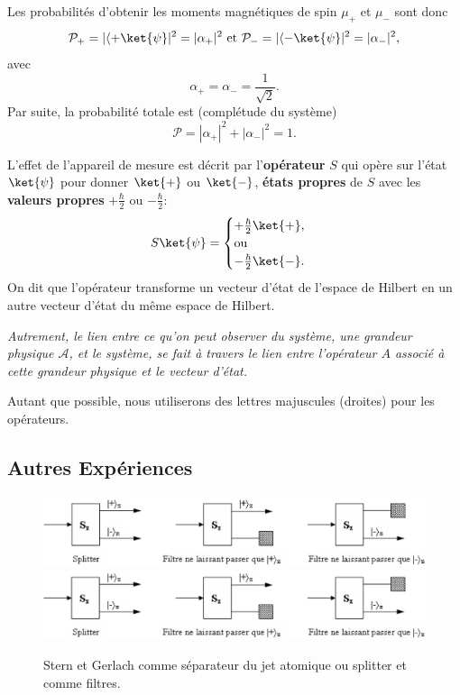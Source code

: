 Les probabilités d'obtenir les moments magnétiques de spin $\mu_{+}$ et
$\mu_{-}$ sont donc%
\begin{equation}
\mathcal{P}_{+}=|\langle+\ket{\psi} |^{2}=|\alpha_{+}|^{2}\text{ et
}\mathcal{P}_{-}=|\langle-\ket{\psi}|^{2}=|\alpha_{-}|^{2},
\end{equation}
avec
\begin{equation}
\alpha_{+}=\alpha_{-}=\frac{1}{\sqrt{2}}.
\end{equation}
Par suite, la probabilité totale est (complétude du système)%
\begin{equation}
\mathcal{P}=|\alpha_{+}|^{2}+|\alpha_{-}|^{2}=1.
\end{equation}

L'effet de l'appareil de mesure est décrit par l'\textbf{opérateur} $S$ qui
opère sur l'état $\ket{\psi} $ pour donner $\ket{+}$ ou $\ket{-}$, \textbf{états
propres} de $S$ avec les \textbf{valeurs propres} $+\frac{\hbar}{2}$ ou
$-\frac{\hbar}{2}$:%
\begin{equation}
S\ket{\psi} =\begin{cases}
+\frac{\hbar}{2}\ket{+},\\
\text{ou}\\
-\frac{\hbar}{2}\ket{-}.
\end{cases}
\end{equation}
On dit que l'opérateur transforme un vecteur d'état de l'espace de Hilbert en
un autre vecteur d'état du même espace de Hilbert.

\medskip\colorbox[gray]{0.8}{
\parbox[c]{0.9\textwidth}{
\emph{Autrement, le lien entre ce qu'on peut observer du système, une grandeur
physique $\mathcal{A}$, et le système, se fait à travers le lien entre
l'opérateur $A$ associé à cette grandeur physique et le vecteur d'état.}
}}
\medskip

Autant que possible, nous utiliserons des lettres majuscules (droites) pour
les opérateurs.%

\subsection{Autres Expériences}

\begin{figure}[ptbh]
\centering
\ifcase\msipdfoutput
	\includegraphics[scale=.9]{graphics/SGSplitterFiltre.eps}
\else
	\includegraphics[scale=.9]{graphics/SGSplitterFiltre.pdf}
\fi
\caption{Stern et Gerlach comme séparateur du jet atomique ou splitter et comme
filtres.}%
\label{fig:SGsplitterFiltre}%
\end{figure}

